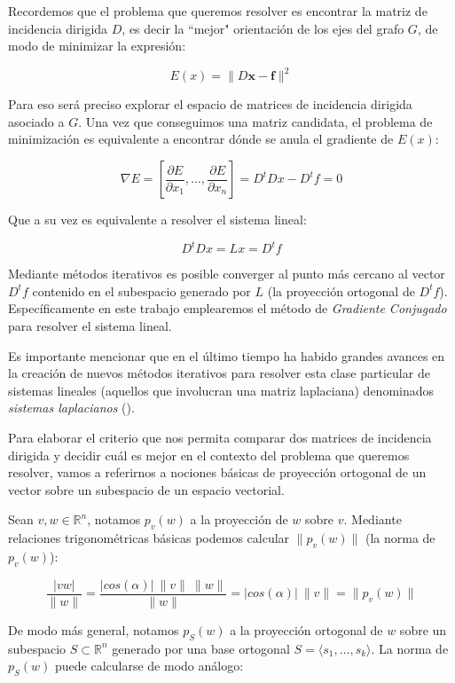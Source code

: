 \documentclass[conference,compsoc,a4paper]{IEEEtran}
\begin{document}
Recordemos que el problema que queremos resolver es encontrar la matriz 
de incidencia dirigida $D$, es decir la ``mejor" orientación de los ejes 
del grafo $G$, de modo de minimizar la expresión:

$$E(x) = \|D\bm{x}-\bm{f}\|^2$$

Para eso será preciso explorar el espacio de matrices de 
incidencia dirigida asociado a $G$. Una vez que conseguimos una 
matriz candidata, el problema de minimización es equivalente a encontrar
dónde se anula el gradiente de $E(x)$:
 
$$\nabla E = [\frac{\partial E}{\partial x_1}, \dots, \frac{\partial 
E}{\partial x_n}] = D^tDx-D^tf=0$$

Que a su vez es equivalente a resolver el sistema lineal:

$$D^tDx = Lx = D^tf$$

Mediante métodos iterativos es posible converger al punto más cercano 
al vector $D^tf$ contenido en el subespacio generado por $L$ (la 
proyección ortogonal de $D^tf$). Específicamente en este trabajo 
emplearemos el método de \textit{Gradiente Conjugado} \cite{Saad:2007} 
para resolver el sistema lineal.

\smallskip

Es importante mencionar que en el último 
tiempo ha habido grandes avances en la creación de nuevos métodos 
iterativos para resolver esta clase particular de sistemas lineales 
(aquellos que involucran una matriz laplaciana) denominados 
\textit{sistemas laplacianos} (\cite{KMP:2010,Spielman:2010,ST:2004,
Teng:2010}).

\bigskip


Para elaborar el criterio que nos permita comparar dos matrices de 
incidencia dirigida y decidir cuál es mejor en el contexto del problema 
que queremos resolver, vamos a referirnos a nociones básicas de 
proyección ortogonal \cite{WK:2009} de un vector sobre un subespacio de un espacio 
vectorial.

\smallskip

Sean $v,w \in \mathbb{R}^n$, notamos $p_v(w)$ a la proyección de $w$ 
sobre $v$. Mediante relaciones trigonométricas básicas podemos 
calcular $\|p_v(w)\|$ (la norma de $p_v(w)$):

$$\frac{|v w|}{\|w\|} = \frac{|cos(\alpha)| \ \|v\| \ \|w\|}{\|w\|} = 
|cos(\alpha)| \ \|v\| = \|p_v(w)\|$$

De modo más general, notamos $p_S(w)$ a la proyección ortogonal de $w$
sobre un subespacio $S \subset \mathbb{R}^n$ generado por una base 
ortogonal $S = \langle s_1, \dots, s_k\rangle $. La norma de $p_S(w)$ puede calcularse
de modo análogo:
\end{document}
